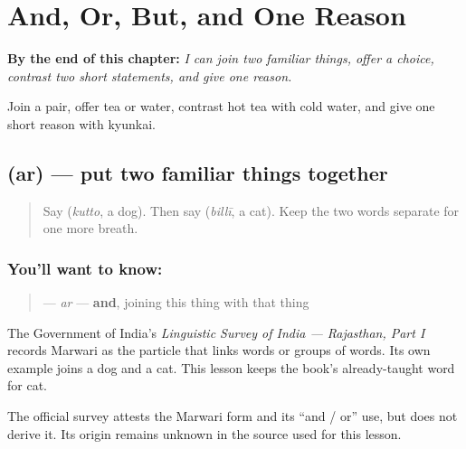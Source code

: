 
\chapter{And, Or, But, and One Reason}
\label{ch:mw-a1-joining-choice}

\begin{chapteropening}
\textbf{By the end of this chapter:} \emph{I can join two familiar things, offer a choice, contrast two short statements, and give one reason.}

Join a pair, offer tea or water, contrast hot tea with cold water, and give one short reason with kyunkai.
\end{chapteropening}

\section[\texorpdfstring{\mw{अर} (ar)}{अर (ar)}]{ (ar) — put two familiar things together}

\label{lesson:MW-C151-ar-together}



\begin{quote}
Say \textbf{} (\emph{kutto}, a dog). Then say \textbf{} (\emph{billī}, a cat). Keep the two words separate for one more breath.
\end{quote}

\subsection*{You'll want to know: }
\begin{quote}
\textbf{} — \emph{ar} — \textbf{and}, joining this thing with that thing
\end{quote}

The Government of India's \emph{Linguistic Survey of India — Rajasthan, Part I} records Marwari \textbf{} as the particle that links words or groups of words. Its own example joins a dog and a cat. This lesson keeps the book's already-taught word \textbf{} for cat.

\begin{cousinweb}
The official survey attests the Marwari form and its “and / or” use, but does not derive it. Its origin remains unknown in the source used for this lesson.
\end{cousinweb}


